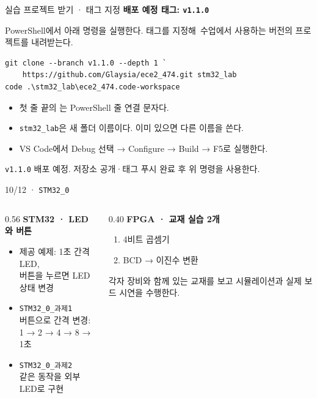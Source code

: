 \documentclass[aspectratio=43,11pt,t]{beamer}
\newcommand{\lab}[1]{\texttt{STM32\_#1}}
\newcommand{\task}[2]{\texttt{STM32\_#1\_과제#2}}
\begin{document}
\begin{frame}[fragile]{실습 프로젝트 받기 · 태그 지정}
\textbf{\color{UOSBlue}배포 예정 태그: \texttt{v1.1.0}}

\small
PowerShell에서 아래 명령을 실행한다. 태그를 지정해\
수업에서 사용하는 버전의 프로젝트를 내려받는다.

\begin{Verbatim}[fontsize=\footnotesize]
git clone --branch v1.1.0 --depth 1 `
    https://github.com/Glaysia/ece2_474.git stm32_lab
code .\stm32_lab\ece2_474.code-workspace
\end{Verbatim}

\begin{itemize}\setlength{\itemsep}{0.12cm}
\item 첫 줄 끝의 \texttt{}는 PowerShell 줄 연결 문자다.
\item \texttt{stm32\_lab}은 새 폴더 이름이다. 이미 있으면 다른 이름을 쓴다.
\item VS Code에서 Debug 선택 → Configure → Build → F5로 실행한다.
\end{itemize}
\vspace{0.10cm}
\footnotesize
\texttt{v1.1.0} 배포 예정. 저장소 공개·태그 푸시 완료 후 위 명령을 사용한다.
\end{frame}
\begin{frame}{10/12 · \lab{0}}
\begin{columns}[T]
\begin{column}{0.56\textwidth}
\textbf{\color{UOSBlue}STM32 · LED와 버튼}
\begin{itemize}\setlength{\itemsep}{0.12cm}
\item 제공 예제: 1초 간격 LED,\\버튼을 누르면 LED 상태 변경
\item \task{0}{1}\\버튼으로 간격 변경:\\1 → 2 → 4 → 8 → 1초
\item \task{0}{2}\\같은 동작을 외부 LED로 구현
\end{itemize}
\end{column}
\begin{column}{0.40\textwidth}
\textbf{\color{UOSBlue}FPGA · 교재 실습 2개}
\begin{enumerate}\setlength{\itemsep}{0.15cm}
\item 4비트 곱셈기
\item BCD → 이진수 변환
\end{enumerate}
\vspace{0.18cm}
\small 각자 장비와 함께 있는 교재를 보고 시뮬레이션과 실제 보드 시연을 수행한다.
\end{column}
\end{columns}
\end{frame}
\end{document}
